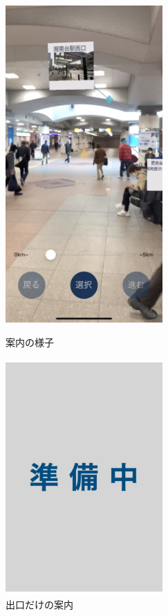 \begin{figure}[h]
  \begin{minipage}{0.5\hsize}
    \centering
    \includegraphics[width=60mm]{images/ar_navigation_shonandai.jpg}
    \caption{案内の様子} \label{fig:ar_navigation_shonandai}
  \end{minipage}
  \begin{minipage}{0.5\hsize}
    \centering
    \includegraphics[width=60mm]{images/wip2.jpg}
    \caption{出口だけの案内} \label{fig:ar_navigation_exit}
  \end{minipage}
\end{figure}

